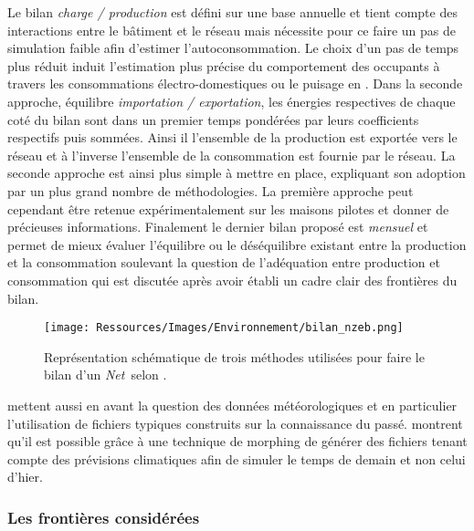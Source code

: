 Le bilan \textit{charge / production} est défini sur une base annuelle et tient compte des
interactions entre le bâtiment et le réseau mais nécessite pour ce faire un pas de
simulation faible afin d’estimer l’autoconsommation. Le choix d’un pas de temps plus
réduit induit l’estimation plus précise du comportement des occupants à travers les
consommations électro-domestiques ou le puisage en . Dans la seconde approche,
équilibre \textit{importation / exportation}, les énergies respectives de chaque coté du
bilan sont dans un premier temps pondérées par leurs coefficients respectifs puis sommées.
Ainsi il l’ensemble de la production est exportée vers le réseau et
à l’inverse l’ensemble de la consommation est fournie par le réseau. La seconde
approche est ainsi plus simple à mettre en place, expliquant son adoption par un plus
grand nombre de méthodologies. La première approche peut cependant être retenue
expérimentalement sur les maisons pilotes et donner de précieuses informations. Finalement
le dernier bilan proposé est \textit{mensuel} et permet de mieux évaluer l’équilibre ou
le déséquilibre existant entre la production et la consommation soulevant la question de
l’adéquation entre production et consommation qui est discutée après avoir établi un cadre
clair des frontières du bilan.
\begin{figure}
    \centering
    \texttt{[image: Ressources/Images/Environnement/bilan\_nzeb.png]}
    \caption[Représentation schématique du bilan d’un \textit{Net}\,]
            {Représentation schématique de trois méthodes utilisées pour faire
             le bilan d’un \textit{Net}\, selon \textcite{Sartori2012220}.}
    \label{fig:bilan_zeb}
\end{figure}

\textcite{Sartori2010} mettent aussi en avant la question des données météorologiques et
en particulier l’utilisation de fichiers typiques construits sur la connaissance du passé.
\textcite{Robert2012150} montrent qu’il est possible grâce à une technique de morphing
\parencite{Belcher200549} de générer des fichiers tenant compte des prévisions climatiques
afin de simuler le temps de demain et non celui d’hier.



\subsubsection{Les frontières considérées} %
\label{ssub:les_frontieres_considerees}
